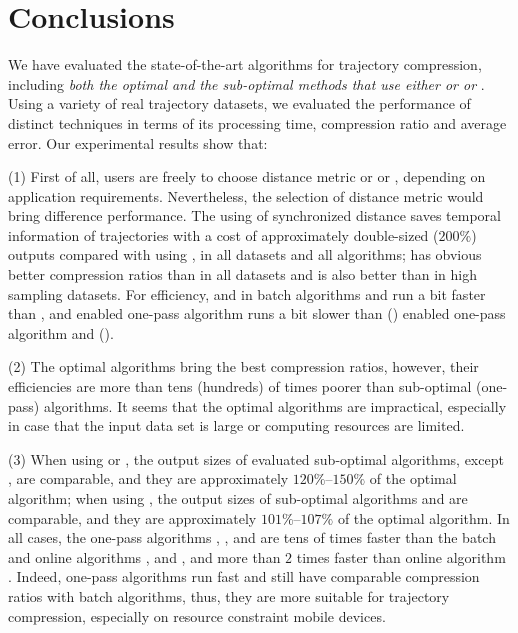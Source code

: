\vspace{-1ex}
\section{Conclusions}

We have evaluated the state-of-the-art \lsa algorithms for trajectory compression, including \emph{both the optimal and the sub-optimal methods that use either \ped or \sed or \dad}.
Using a variety of real trajectory datasets, we evaluated the performance of distinct techniques in terms of its processing time, compression ratio and average error.
Our experimental results show that:

(1) First of all, users are freely to choose distance metric \sed or \ped or \dad, depending on application requirements. Nevertheless, the selection of distance metric would bring difference performance. The using of synchronized distance \sed saves temporal information of trajectories with a cost of approximately double-sized (\ie $200\%$) outputs compared with using \ped, in all datasets and all algorithms; \ped has obvious better compression ratios than \dad in all datasets and \sed is also better than \dad in high sampling datasets. For efficiency, \sed and \dad in batch algorithms \dpa and \tpa run a bit faster than \ped, and \sed enabled one-pass algorithm \cised runs a bit slower than \ped (\dad) enabled one-pass algorithm \siped and \operb (\interval).

(2) The optimal algorithms bring the best compression ratios, however, their efficiencies are more than tens (hundreds) of times poorer than sub-optimal (one-pass) algorithms. It seems that the optimal algorithms are impractical, especially in case that the input data set is large or computing resources are limited.

(3) When using \ped or \sed, the output sizes of evaluated sub-optimal algorithms, except \squishe, are comparable, and they are approximately $120\%$--$150\%$ of the optimal algorithm; when using \dad, the output sizes of sub-optimal algorithms \tpa and \interval are comparable, and they are approximately $101\%$--$107\%$ of the optimal algorithm. In all cases, the one-pass algorithms \siped, \operb, \cised and \interval are tens of times faster than the batch and online algorithms \tpa, \dpa and \bqsa, and more than $2$ times faster than online algorithm \squishe. Indeed, one-pass algorithms run fast and still have comparable compression ratios with batch algorithms, thus, they are more suitable for trajectory compression, especially on resource constraint mobile devices.

